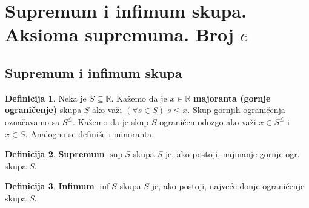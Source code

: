 \documentclass[a4paper,12pt]{article}
\theoremstyle{plain}
\theoremstyle{definition}
\newtheorem{definition}{Definicija}[section]
\theoremstyle{remark}
\begin{document}
\section{Supremum i infimum skupa. Aksioma supremuma. Broj \texorpdfstring{$e$}{e}}
\subsection{Supremum i infimum skupa}
\begin{definition}
    Neka je $S \subseteq \mathbb{R}$. Kažemo da je $x \in \mathbb{R}$ \textbf{majoranta (gornje ograničenje)} skupa $S$ ako važi $(\forall s \in S)\; s \leq x$. Skup gornjih ograničenja označavamo sa $S^\leq$. Kažemo da je skup $S$ ograničen odozgo ako važi $x \in S^\leq$ i $x \in S$. Analogno se definiše i minoranta.
\end{definition}
\begin{definition}
    \textbf{Supremum} $\sup S$ skupa $S$ je, ako postoji, najmanje gornje ogr. skupa $S$.
\end{definition}
\begin{definition}
    \textbf{Infimum} $\inf S$ skupa $S$ je, ako postoji, najveće donje ograničenje skupa $S$.
\end{definition}
\end{document}
